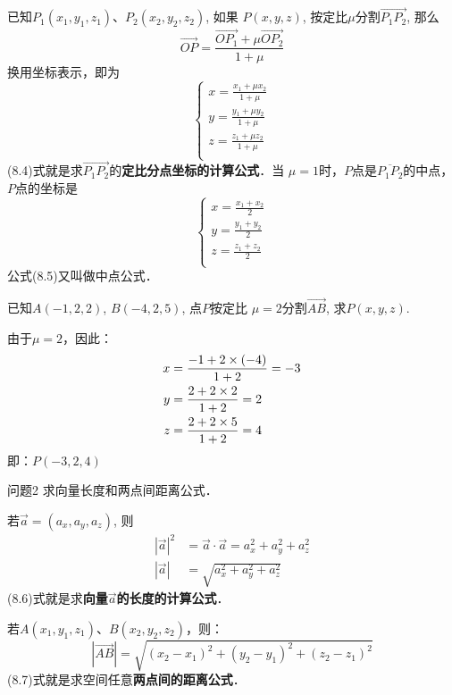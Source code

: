 已知$P_1(x_1,y_1,z_1)$、$P_2(x_2,y_2,z_2)$, 如果
$P(x,y,z)$, 按定比$\mu$分割$\Vec{P_1P_2}$, 那么
\[\Vec{OP}=\frac{\Vec{OP_1}+\mu \Vec{OP_2}}{1+\mu}\]
换用坐标表示，即为
\begin{equation}
    \begin{cases}
        x=\frac{x_1+\mu x_2}{1+\mu}\\
        y=\frac{y_1+\mu y_2}{1+\mu}\\
        z=\frac{z_1+\mu z_2}{1+\mu}\\
    \end{cases}
\end{equation}
(8.4)式就是求$\Vec{P_1P_2}$的\textbf{定比分点坐标的计算公式}．当
$\mu=1$时，$P$点是$\overline{P_1P_2}$的中点，$P$点的坐标是
\begin{equation}
    \begin{cases}
        x=\frac{x_1+ x_2}{2}\\
        y=\frac{y_1+ y_2}{2}\\
        z=\frac{z_1+ z_2}{2}\\
    \end{cases}
\end{equation}
公式(8.5)又叫做中点公式．


\begin{example}
已知$A(-1,2,2)$, $B(-4,2,5)$, 点$P$按定比
$\mu=2$分割$\Vec{AB}$, 求$P(x,y,z)$.
\end{example}

\begin{solution}
由于$\mu=2$，因此：
\[\begin{split}
    x&=\dfrac{-1+2\times (-4)}{1+2}=-3\\
    y&=\dfrac{2+2\times 2}{1+2}=2\\
    z&=\dfrac{2+2\times 5}{1+2}=4\\
\end{split}\]    
即：$P(-3,2,4)$
\end{solution}

\begin{blk}{问题2}
    求向量长度和两点间距离公式．
\end{blk}

若$\vec{a}=(a_x,a_y,a_z)$, 则
\begin{align}
    |\vec{a}|^2&=\vec{a}\cdot \vec{a} =a^2_x+a^2_y+a^2_z\nonumber\\
|\vec{a}|&=\sqrt{a^2_x+a^2_y+a^2_z}
\end{align}
(8.6)式就是求\textbf{向量$\vec{a}$的长度的计算公式}．

若$A(x_1,y_1,z_1)$、$B(x_2,y_2,z_2)$，则：
\begin{equation}
   |\Vec{AB}|=\sqrt{(x_2-x_1)^2+(y_2-y_1)^2+(z_2-z_1)^2} 
\end{equation}
(8.7)式就是求空间任意\textbf{两点间的距离公式}．


